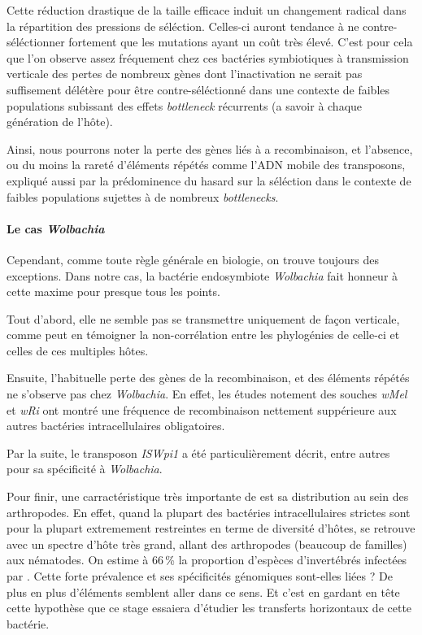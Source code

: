 Cette réduction drastique de la taille efficace induit un changement radical dans la répartition des pressions de séléction. Celles-ci auront tendance à ne contre-séléctionner fortement que les mutations ayant un coût très élevé.
C'est pour cela que l'on observe assez fréquement chez ces bactéries symbiotiques à transmission verticale des pertes de nombreux gènes\cite{wernegreen2002} dont  l'inactivation ne serait pas suffisement délétère pour être contre-séléctionné dans une contexte de faibles populations subissant des effets \textit{bottleneck} récurrents (a savoir à chaque génération de l'hôte).


Ainsi, nous pourrons noter la perte des gènes liés à a recombinaison, et l'absence, ou du moins la rareté d'éléments répétés comme l'ADN mobile des transposons, expliqué aussi par la prédominence du hasard sur la séléction dans le contexte de faibles populations sujettes à de nombreux \textit{bottlenecks}.

\paragraph{Le cas \textit{Wolbachia}\\}
Cependant, comme toute règle générale en biologie, on trouve toujours des exceptions. Dans notre cas, la bactérie endosymbiote \textit{Wolbachia} fait honneur à cette maxime pour presque tous les points. 

Tout d'abord, elle ne semble pas se transmettre uniquement de façon verticale, comme peut en témoigner la non-corrélation entre les phylogénies de celle-ci et celles de ces multiples hôtes\cite{vavre1999}.

Ensuite, l’habituelle perte des gènes de la recombinaison, et des éléments répétés ne s’observe pas chez \textit{Wolbachia}. En effet, les études notement des souches \textit{wMel} et \textit{wRi} ont montré une fréquence de recombinaison nettement suppérieure aux autres bactéries intracellulaires obligatoires.

Par la suite, le transposon \textit{ISWpi1} a été particulièrement décrit\cite{Cordaux2008}, entre autres pour sa spécificité à \textit{Wolbachia}.%

Pour finir, une carractéristique très importante de  est sa distribution au sein des arthropodes. En effet, quand la plupart des bactéries intracellulaires strictes sont pour la plupart extremement restreintes en terme de diversité d'hôtes,  se retrouve avec un spectre d'hôte très grand, allant des arthropodes (beaucoup de familles) aux nématodes. On estime à 66\,\% la proportion d'espèces d'invertébrés infectées par \cite{hilgenboecker2008}.
Cette forte prévalence et ses spécificités génomiques sont-elles liées ? De plus en plus d'éléments semblent aller dans ce sens. Et c'est en gardant en tête cette hypothèse que ce stage essaiera d'étudier les transferts horizontaux de cette bactérie.


